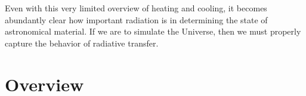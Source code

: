 Even with this very limited overview of heating and cooling, it becomes abundantly clear how important radiation is in determining the state of astronomical material. If we are to simulate the Universe, then we must properly capture the behavior of radiative transfer.

%



%
%
%
%
% 
%
%
% 
%





\section{Overview}
\label{sec:overview}

